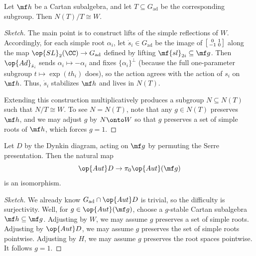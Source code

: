 \documentclass{article}
\begin{document}
\begin{proposition}
	Let $\mf h$ be a Cartan subalgebra, and let $T\subseteq G_{\mathrm{ad}}$ be the corresponding subgroup. Then $N(T)/T\cong W$.
\end{proposition}
\begin{proof}[Sketch]
	The main point is to construct lifts of the simple reflections of $W$. Accordingly, for each simple root $\alpha_i$, let $\dot s_i\in G_{\mathrm{ad}}$ be the image of $\begin{bsmallmatrix}
		0 & 1 \\ -1 & 0
	\end{bsmallmatrix}$ along the map $\op{SL}_2(\CC)\to G_{\mathrm{ad}}$ defined by lifting $\mf{sl}_{2i}\subseteq\mf g$. Then $\op{Ad}_{\dot s_i}$ sends $\alpha_i\mapsto-\alpha_i$ and fixes $\{\alpha_i\}^\perp$ (because the full one-parameter subgroup $t\mapsto\exp(th_i)$ does), so the action agrees with the action of $s_i$ on $\mf h$. Thus, $\dot s_i$ stabilizes $\mf h$ and lives in $N(T)$.

	Extending this construction multiplicatively produces a subgroup $N\subseteq N(T)$ such that $N/T\cong W$. To see $N=N(T)$, note that any $g\in N(T)$ preserves $\mf h$, and we may adjust $g$ by $N\onto W$ so that $g$ preserves a set of simple roots of $\mf h$, which forces $g=1$.
\end{proof}
\begin{proposition}
	Let $D$ by the Dynkin diagram, acting on $\mf g$ by permuting the Serre presentation. Then the natural map
	\[\op{Aut}D\to\pi_0\op{Aut}(\mf g)\]
	is an isomorphism.
\end{proposition}
\begin{proof}[Sketch]
	We already know $G_{\mathrm{ad}}\cap\op{Aut}D$ is trivial, so the difficulty is surjectivity. Well, for $g\in\op{Aut}(\mf g)$, choose a $g$-stable Cartan subalgebra $\mf h\subseteq\mf g$. Adjusting by $W$, we may assume $g$ preserves a set of simple roots. Adjusting by $\op{Aut}D$, we may assume $g$ preserves the set of simple roots pointwise. Adjusting by $H$, we may assume $g$ preserves the root spaces pointwise. It follows $g=1$. 
\end{proof}
\end{document}

